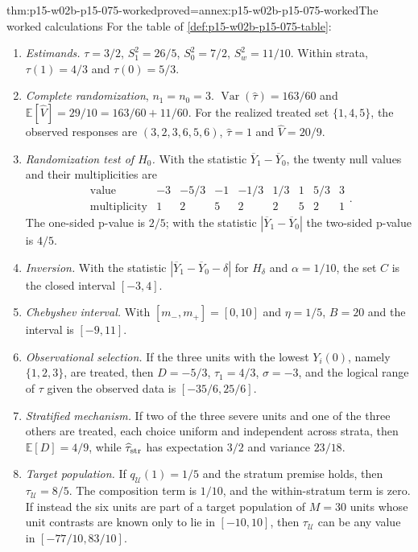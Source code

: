 \begin{hbtheorem}{thm:p15-w02b-p15-075-worked}{proved=annex:p15-w02b-p15-075-worked}{The worked calculations}
For the table of \cref{def:p15-w02b-p15-075-table}:
\begin{enumerate}
\item \emph{Estimands.} \(\tau=3/2\), \(S_1^2=26/5\), \(S_0^2=7/2\),
\(S_w^2=11/10\). Within strata, \(\tau(1)=4/3\) and \(\tau(0)=5/3\).
\item \emph{Complete randomization}, \(n_1=n_0=3\).
\(\operatorname{Var}(\widehat\tau)=163/60\) and
\(\mathbb E[\widehat V]=29/10=163/60+11/60\).
For the realized treated set \(\{1,4,5\}\), the observed responses are
\((3,2,3,6,5,6)\), \(\widehat\tau=1\) and \(\widehat V=20/9\).
\item \emph{Randomization test of \(H_0\).} With the statistic
\(\overline Y_1-\overline Y_0\), the twenty null values and their
multiplicities are
\[
\begin{array}{c|cccccccc}
 \text{value}&-3&-5/3&-1&-1/3&1/3&1&5/3&3\\\hline
 \text{multiplicity}&1&2&5&2&2&5&2&1
\end{array}.
\] The one-sided p-value is \(2/5\); with the statistic
\(|\overline Y_1-\overline Y_0|\) the two-sided p-value is \(4/5\).
\item \emph{Inversion.} With the statistic
\(|\overline Y_1-\overline Y_0-\delta|\) for \(H_\delta\) and
\(\alpha=1/10\), the set \(C\) is the closed interval \([-3,4]\).
\item \emph{Chebyshev interval.} With \([m_-,m_+]=[0,10]\) and
\(\eta=1/5\), \(B=20\) and the interval is \([-9,11]\).
\item \emph{Observational selection.} If the three units with the lowest
\(Y_i(0)\), namely \(\{1,2,3\}\), are treated, then \(D=-5/3\),
\(\tau_1=4/3\), \(\sigma=-3\), and the logical range of \(\tau\) given the
observed data is \([-35/6,25/6]\).
\item \emph{Stratified mechanism.} If two of the three severe units and one of
the three others are treated, each choice uniform and independent across strata,
then \(\mathbb E[D]=4/9\), while \(\widehat\tau_{\rm str}\) has expectation
\(3/2\) and variance \(23/18\).
\item \emph{Target population.} If \(q_{\mathcal U}(1)=1/5\) and the stratum
premise holds, then \(\tau_{\mathcal U}=8/5\). The composition term is
\(1/10\), and the within-stratum term is zero. If instead the six units are part
of a target population of \(M=30\) units whose unit contrasts are known only to
lie in \([-10,10]\), then \(\tau_{\mathcal U}\) can be any value in
\([-77/10,83/10]\).
\end{enumerate}
\end{hbtheorem}

